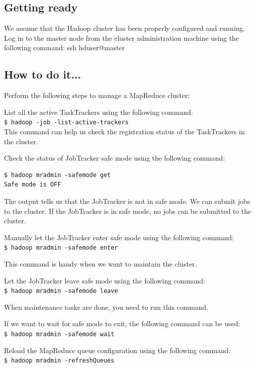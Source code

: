 \subsection*{Getting ready}
We assume that the Hadoop cluster has been properly configured and running.
Log in to the master node from the cluster administration machine using the following command:
ssh hduser@master
\subsection*{How to do it...}
Perform the following steps to manage a MapReduce cluster:

List all the active TaskTrackers using the following command: \\
\verb|$ hadoop -job -list-active-trackers| \\
This command can help us check the registration status of the TaskTrackers in the cluster.

Check the status of JobTracker safe mode using the following command:
\lstset{style=bashstyle}
\begin{lstlisting}
$ hadoop mradmin -safemode get
Safe mode is OFF
\end{lstlisting}

The output tells us that the JobTracker is not in safe mode. We can submit jobs to the cluster. If the JobTracker is in safe mode, no jobs can be submitted to the cluster.

Manually let the JobTracker enter safe mode using the following command: \\
\verb|$ hadoop mradmin -safemode enter|

This command is handy when we want to maintain the cluster.

Let the JobTracker leave safe mode using the following command: \\
\verb|$ hadoop mradmin -safemode leave|

\begin{warning} When maintenance tasks are done, you need to run this command.\end{warning}

If we want to wait for safe mode to exit, the following command can be used: \\
\verb|$ hadoop mradmin -safemode wait|

Reload the MapReduce queue configuration using the following command: \\
\verb|$ hadoop mradmin -refreshQueues|

